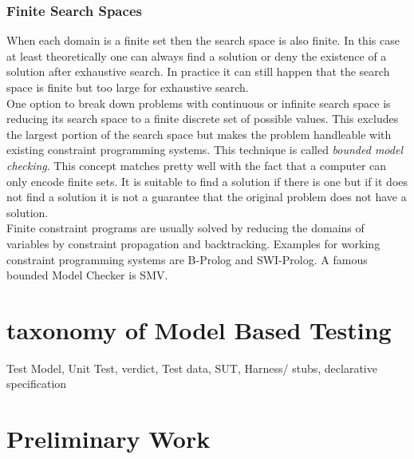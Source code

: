 \subsubsection{Finite Search Spaces}
When each domain is a finite set then the search space is also finite. In this case at least theoretically one can always find a solution or deny the existence of a solution after exhaustive search. In practice it can still happen that the search space is finite but too large for exhaustive search.\\
One option to break down problems with continuous or infinite search space is reducing its search space to a finite discrete set of possible values. This excludes the largest portion of the search space but makes the problem handleable with existing constraint programming systems. This technique is called \emph{bounded model checking}. This concept matches pretty well with the fact that a computer can only encode finite sets. It is suitable to find a solution if there is one but if it does not find a solution it is not a guarantee that the original problem does not have a solution.\\
Finite constraint programs are usually solved by reducing the domains of variables by constraint propagation and backtracking. Examples for working constraint programming systems are B-Prolog and SWI-Prolog\cite{citation needed}. A famous bounded Model Checker is SMV\cite{citation needed}. 




\section{taxonomy of Model Based Testing}
Test Model,
Unit Test,
verdict,
Test data,
SUT,
Harness/ stubs,
declarative specification

\section{Preliminary Work}
